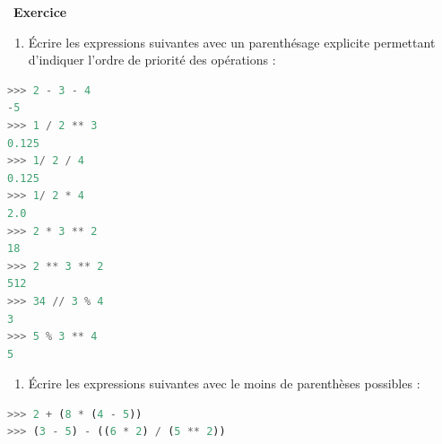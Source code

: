 \documentclass[
  11pt,
]{article}
\providecommand{\tightlist}{%
  \setlength{\itemsep}{0pt}\setlength{\parskip}{0pt}}
\newcounter{exo}
\newenvironment{exercice}[1]
{\par \medskip   \addtocounter{exo}{1} \noindent  
\begin{bclogo}[arrondi =0.1,   noborder = true, logo=\bccrayon, marge=4]{~\textbf{Exercice} \textbf{\theexo} {\itshape #1} }  \par}
{
\end{bclogo}
 \par \bigskip }
\newcounter{def}
\begin{document}
\begin{exercice}{}

\begin{enumerate}
\def\labelenumi{\arabic{enumi}.}
\tightlist
\item
  Écrire les expressions suivantes avec un parenthésage explicite
  permettant d'indiquer l'ordre de priorité des opérations :
\end{enumerate}

\begin{lstlisting}[language=Python]
>>> 2 - 3 - 4 
-5
>>> 1 / 2 ** 3
0.125
>>> 1/ 2 / 4
0.125
>>> 1/ 2 * 4
2.0
>>> 2 * 3 ** 2
18
>>> 2 ** 3 ** 2
512
>>> 34 // 3 % 4 
3
>>> 5 % 3 ** 4
5
\end{lstlisting}

\begin{enumerate}
\def\labelenumi{\arabic{enumi}.}
\setcounter{enumi}{1}
\tightlist
\item
  Écrire les expressions suivantes avec le moins de parenthèses
  possibles :
\end{enumerate}

\begin{lstlisting}[language=Python]
>>> 2 + (8 * (4 - 5))
>>> (3 - 5) - ((6 * 2) / (5 ** 2)) 
\end{lstlisting}

\end{exercice}
\end{document}
